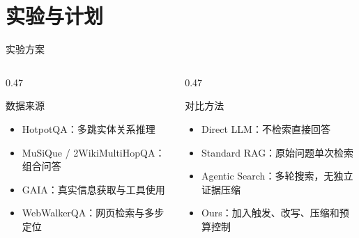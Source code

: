 \documentclass{sintefbeamer}
\newcommand{\tightlist}{\setlength{\itemsep}{0.45em}\setlength{\parskip}{0pt}}
\begin{document}

\section{实验与计划}

\begin{frame}{实验方案}
  \begin{columns}[T]
    \begin{column}{0.47\textwidth}
      \begin{block}{数据来源}
        \begin{itemize}
          \tightlist
          \item HotpotQA：多跳实体关系推理
          \item MuSiQue / 2WikiMultiHopQA：组合问答
          \item GAIA：真实信息获取与工具使用
          \item WebWalkerQA：网页检索与多步定位
        \end{itemize}
      \end{block}
    \end{column}
    \begin{column}{0.47\textwidth}
      \begin{block}{对比方法}
        \begin{itemize}
          \tightlist
          \item Direct LLM：不检索直接回答
          \item Standard RAG：原始问题单次检索
          \item Agentic Search：多轮搜索，无独立证据压缩
          \item Ours：加入触发、改写、压缩和预算控制
        \end{itemize}
      \end{block}
    \end{column}
  \end{columns}
\end{frame}
\end{document}
